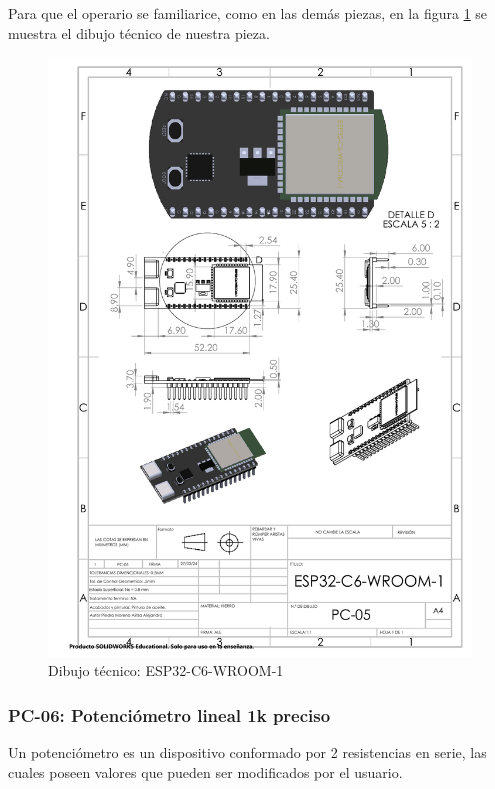 Para que el operario se familiarice, como en las demás piezas, en la figura \ref{fig:esp} se muestra el dibujo técnico de nuestra pieza.
\begin{figure}[H]
    \centering
    \includegraphics[trim = {7mm 1mm 1mm 1mm},clip,scale=0.4]{22/Img/esp32Dibujo.pdf}
    \caption{Dibujo técnico: ESP32-C6-WROOM-1}
    \label{fig:esp}
\end{figure}

\subsubsection{PC-06: Potenciómetro lineal 1k preciso }
Un potenciómetro es un dispositivo conformado por 2 resistencias en serie, las cuales poseen valores que pueden ser modificados por el usuario. 


